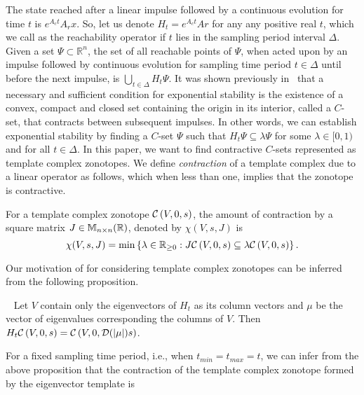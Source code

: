 
The state reached after a linear impulse followed by a continuous
evolution for time $t$ is $e^{A_ct}A_rx$.  So, let us denote
$H_t=e^{A_ct}Ar$ for any any positive real $t$, which we call as the
reachability operator if $t$ lies in the sampling period interval
$\Delta$.  Given a set $\Psi\subset\mathbb{R}^n$, the set of all
reachable points of $\Psi$, when acted upon by an impulse followed by
continuous evolution for sampling time period $t\in\Delta$ until
before the next impulse, is $\bigcup_{t\in\Delta}H_t\Psi$.  It was
shown previously in~\cite{2014-fiacchini-set,AlKhatib2015} that a
necessary and sufficient condition for exponential stability is the
existence of a convex, compact and closed set containing the origin in
its interior, called a $C$-set, that contracts between subsequent
impulses.  In other words, we can establish exponential stability by
finding a $C$-set $\Psi$ such that $H_t\Psi\subseteq\lambda\Psi$ for
some $\lambda\in[0,1)$ and for all $t\in\Delta$.  In this paper, we
  want to find contractive $C$-sets represented as template complex
  zonotopes.  We define \emph{contraction} of a
template complex due to a linear operator as follows, which when less
than one, implies that the zonotope is contractive.
%
\begin{defn}
For a template complex zonotope $\mathcal{C}\left(V,0,s\right)$, the amount of contraction by a
square matrix $J\in\mathbb{M}_{n\times n}(\mathbb{R})$, denoted by $\chi(V,s,J)$
is \[\chi(V,s,J)=\min\left\{\lambda\in\mathbb{R}_{\geq 0}:J\mathcal{C}\left(V,0,s\right)\subseteq
\lambda\mathcal{C}\left(V,0,s\right)\right\}.\]
\end{defn}
%
Our motivation of for considering
template complex zonotopes can be
inferred from the following proposition.  
%
\begin{prop}~\label{prop:eig-cont}
  Let $V$ contain only the eigenvectors of $H_t$ as its column vectors
  and $\mu$ be the vector of eigenvalues corresponding the columns of
  $V$.  Then $H_t\mathcal{C}\left(V,0,s\right)=\mathcal{C}\left(V,0,\mathcal{D}(|\mu|)s\right)$.
\end{prop}
%
For a fixed sampling time period, i.e., when $t_{min}=t_{max}=t$, we
can infer from the above proposition that the contraction of the
template complex zonotope formed by the eigenvector template is
